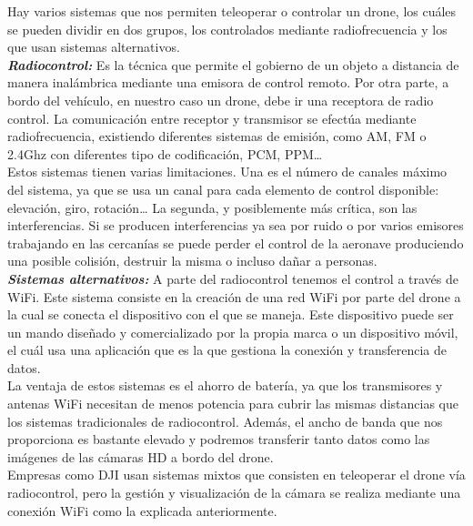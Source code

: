 Hay varios sistemas que nos permiten teleoperar o controlar un drone, los cuáles se pueden dividir en dos grupos, los controlados mediante radiofrecuencia y los que usan sistemas alternativos.\\

\emph{\textbf{Radiocontrol:}} Es la técnica que permite el gobierno de un objeto a distancia de manera inalámbrica mediante una emisora de control remoto. Por otra parte, a bordo del vehículo, en nuestro caso un drone, debe ir una receptora de radio control. La comunicación entre receptor y transmisor se efectúa mediante radiofrecuencia, existiendo diferentes sistemas de emisión, como AM, FM o 2.4Ghz con diferentes tipo de codificación, PCM, PPM…\\

Estos sistemas tienen varias limitaciones. Una es el número de canales máximo del sistema, ya que se usa un canal para cada elemento de control disponible: elevación, giro, rotación… La segunda, y posiblemente más crítica, son las interferencias. Si se producen interferencias ya sea por ruido o por varios emisores trabajando en las cercanías se puede perder el control de la aeronave produciendo una posible colisión, destruir la misma o incluso dañar a personas.\\
 

\emph{\textbf{Sistemas alternativos:}} A parte del radiocontrol tenemos el control a través de WiFi. Este sistema consiste en la creación de una red WiFi por parte del drone a la cual se conecta el dispositivo con el que se maneja. Este dispositivo puede ser un mando diseñado y comercializado por la propia marca o un dispositivo móvil, el cuál usa una aplicación que es la que gestiona la conexión y transferencia de datos.\\

La ventaja de estos sistemas es el ahorro de batería, ya que los transmisores y antenas WiFi necesitan de menos potencia para cubrir las mismas distancias que los sistemas tradicionales de radiocontrol. Además, el ancho de banda que nos proporciona es bastante elevado y podremos transferir tanto datos como las imágenes de las cámaras HD a bordo del drone.\\

Empresas como DJI usan sistemas mixtos que consisten en teleoperar el drone vía radiocontrol, pero la gestión y visualización de la cámara se realiza mediante una conexión WiFi como la explicada anteriormente.\\
 
